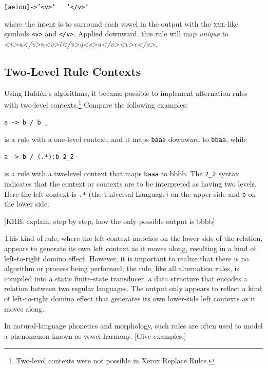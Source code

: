 \documentclass[letterpaper,12pt]{article}
\newcommand{\acro}{\textsc}
\begin{document}
\begin{alltt}
[aeiou] -> '<v>' ~~~ '</v>'
\end{alltt}

\noindent
where the intent is to surround each vowel in the output with the \acro{xml}-like symbols \verb!<v>! and \verb!</v>!.  Applied downward,
this rule will map \emph{unique} to \emph{<v>u</v>n<v>i</v>q<v>u</v><v>e</v>}.

\subsection{Two-Level Rule Contexts}

Using Huld\'en's algorithms, it became possible to implement alternation rules with two-level contexts.\footnote{Two-level contexts
were not possible in Xerox Replace Rules.}
Compare the following examples:

\begin{Verbatim}[fontsize=\small]
a -> b / b _
\end{Verbatim}

\noindent
is a rule with a one-level context, and it maps \texttt{baaa} downward to \texttt{bbaa}, while

\begin{Verbatim}[fontsize=\small]
a -> b / (.*):b 2_2
\end{Verbatim}

\noindent
is a rule with a two-level context that maps \texttt{baaa} to {bbbb}.  The \verb!2_2! syntax indicates that the context or contexts are to be interpreted as
having two levels.  Here the left context is \verb!.*! (the Universal Language) on the upper side and \verb!b! on the
lower side.

[KRB:  explain, step by step, how the only possible output is bbbb]

This kind of rule, where the left-context matches on
the lower side of the relation, appears to generate its own left context as it moves
along, resulting in a kind of left-to-right domino effect.  However, it is
important to realize that there is no algorithm or process being performed; the rule,
like all alternation rules, is compiled into a static finite-state transducer, a data
structure that encodes a
relation between two regular languages.  The output only appears to reflect a kind of
left-to-right domino effect that generates its own lower-side left contexts as it
moves along.

In natural-language phonetics and morphology, such rules are often used to model a phenomenon known
as vowel harmony.  [Give examples.]
\end{document}
